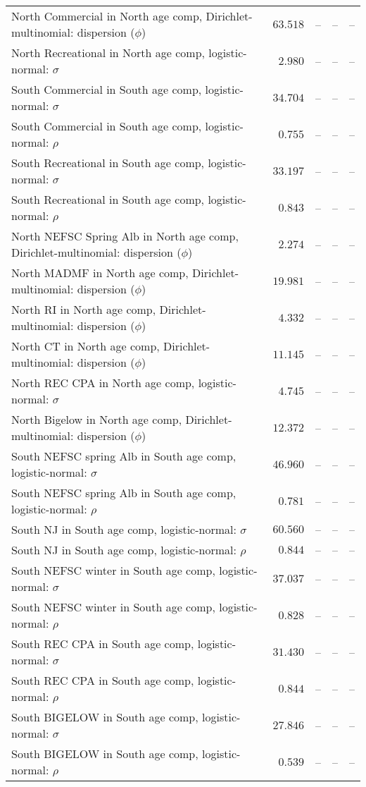 \documentclass[
]{article}
\begin{document}
\begin{landscape}
\begin{longtable}[t]{lrrrr}
North Commercial in North age comp, Dirichlet-multinomial: dispersion ($\phi$) & $63.518$ & -- & -- & --\\
\addlinespace
North Recreational in North age comp, logistic-normal: $\sigma$ & $2.980$ & -- & -- & --\\
South Commercial in South age comp, logistic-normal: $\sigma$ & $34.704$ & -- & -- & --\\
South Commercial in South age comp, logistic-normal: $\rho$ & $0.755$ & -- & -- & --\\
South Recreational in South age comp, logistic-normal: $\sigma$ & $33.197$ & -- & -- & --\\
South Recreational in South age comp, logistic-normal: $\rho$ & $0.843$ & -- & -- & --\\
\addlinespace
North NEFSC Spring Alb in North age comp, Dirichlet-multinomial: dispersion ($\phi$) & $2.274$ & -- & -- & --\\
North MADMF in North age comp, Dirichlet-multinomial: dispersion ($\phi$) & $19.981$ & -- & -- & --\\
North RI in North age comp, Dirichlet-multinomial: dispersion ($\phi$) & $4.332$ & -- & -- & --\\
North CT in North age comp, Dirichlet-multinomial: dispersion ($\phi$) & $11.145$ & -- & -- & --\\
North REC CPA in North age comp, logistic-normal: $\sigma$ & $4.745$ & -- & -- & --\\
\addlinespace
North Bigelow in North age comp, Dirichlet-multinomial: dispersion ($\phi$) & $12.372$ & -- & -- & --\\
South NEFSC spring Alb in South age comp, logistic-normal: $\sigma$ & $46.960$ & -- & -- & --\\
South NEFSC spring Alb in South age comp, logistic-normal: $\rho$ & $0.781$ & -- & -- & --\\
South NJ in South age comp, logistic-normal: $\sigma$ & $60.560$ & -- & -- & --\\
South NJ in South age comp, logistic-normal: $\rho$ & $0.844$ & -- & -- & --\\
\addlinespace
South NEFSC winter in South age comp, logistic-normal: $\sigma$ & $37.037$ & -- & -- & --\\
South NEFSC winter in South age comp, logistic-normal: $\rho$ & $0.828$ & -- & -- & --\\
South REC CPA in South age comp, logistic-normal: $\sigma$ & $31.430$ & -- & -- & --\\
South REC CPA in South age comp, logistic-normal: $\rho$ & $0.844$ & -- & -- & --\\
South BIGELOW in South age comp, logistic-normal: $\sigma$ & $27.846$ & -- & -- & --\\
\addlinespace
South BIGELOW in South age comp, logistic-normal: $\rho$ & $0.539$ & -- & -- & --\\*
\end{longtable}
\end{landscape}
\end{document}
